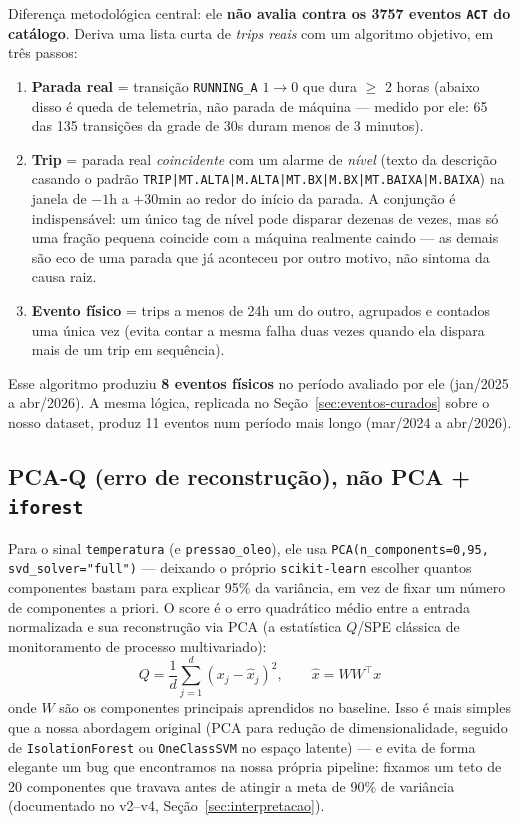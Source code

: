 \documentclass[11pt,a4paper]{article}
\begin{document}
Diferença metodológica central: ele \textbf{não avalia contra os 3757
eventos \texttt{ACT} do catálogo}. Deriva uma lista curta de
\emph{trips reais} com um algoritmo objetivo, em três passos:

\begin{enumerate}[leftmargin=1.6em]
  \item \textbf{Parada real} = transição \texttt{RUNNING\_A} $1\to0$ que
  dura $\geq$ 2 horas (abaixo disso é queda de telemetria, não parada de
  máquina --- medido por ele: 65 das 135 transições da grade de 30s
  duram menos de 3 minutos).
  \item \textbf{Trip} = parada real \emph{coincidente} com um alarme de
  \emph{nível} (texto da descrição casando o padrão
  \texttt{TRIP|MT.ALTA|M.ALTA|MT.BX|M.BX|MT.BAIXA|M.BAIXA}) na janela de
  $-1$h a $+30$min ao redor do início da parada. A conjunção é
  indispensável: um único tag de nível pode disparar dezenas de vezes,
  mas só uma fração pequena coincide com a máquina realmente caindo ---
  as demais são eco de uma parada que já aconteceu por outro motivo, não
  sintoma da causa raiz.
  \item \textbf{Evento físico} = trips a menos de 24h um do outro,
  agrupados e contados uma única vez (evita contar a mesma falha
  duas vezes quando ela dispara mais de um trip em sequência).
\end{enumerate}

Esse algoritmo produziu \textbf{8 eventos físicos} no período avaliado
por ele (jan/2025 a abr/2026). A mesma lógica, replicada no
Seção~\ref{sec:eventos-curados} sobre o nosso dataset, produz 11 eventos
num período mais longo (mar/2024 a abr/2026).

\subsection{PCA-Q (erro de reconstrução), não PCA + \texttt{iforest}}

Para o sinal \texttt{temperatura} (e \texttt{pressao\_oleo}), ele usa
\texttt{PCA(n\_components=0{,}95, svd\_solver="full")} --- deixando o
próprio \texttt{scikit-learn} escolher quantos componentes bastam para
explicar 95\% da variância, em vez de fixar um número de componentes a
priori. O score é o erro quadrático médio entre a entrada normalizada e
sua reconstrução via PCA (a estatística $Q$/SPE clássica de monitoramento
de processo multivariado):
\[
  Q = \frac{1}{d}\sum_{j=1}^{d} \left(x_j - \hat{x}_j\right)^2,
  \qquad \hat{x} = W W^\top x
\]
onde $W$ são os componentes principais aprendidos no baseline. Isso é
mais simples que a nossa abordagem original (PCA para redução de
dimensionalidade, seguido de \texttt{IsolationForest} ou \texttt{OneClassSVM}
no espaço latente) --- e evita de forma elegante um bug que encontramos
na nossa própria pipeline: fixamos um teto de 20 componentes que travava
antes de atingir a meta de 90\% de variância (documentado no v2--v4,
Seção~\ref{sec:interpretacao}).
\end{document}
